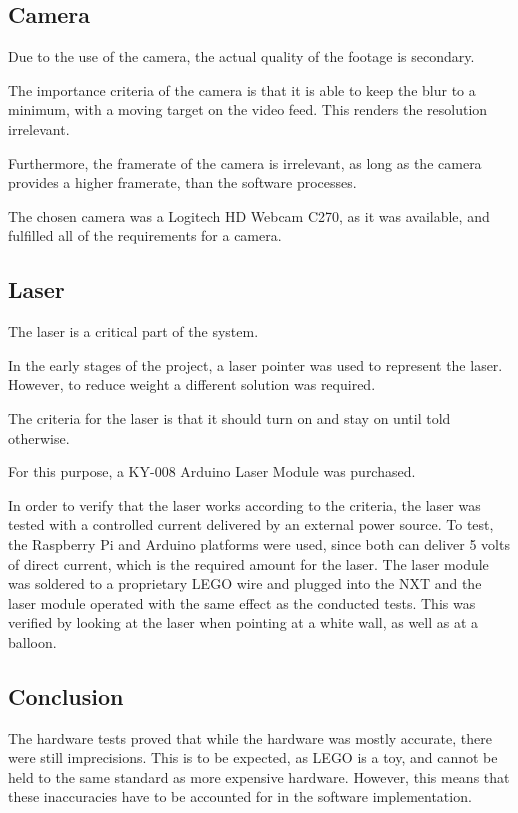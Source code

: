 \subsection*{Camera}
Due to the use of the camera, the actual quality of the footage is secondary.

The importance criteria of the camera is that it is able to keep the blur to a minimum, with a moving target on the video feed.
This renders the resolution irrelevant.

Furthermore, the framerate of the camera is irrelevant, as long as the camera provides a higher framerate, than the software processes.

The chosen camera was a Logitech HD Webcam C270, as it was available, and fulfilled all of the requirements for a camera\cite{logitechwebcam}.

\subsection*{Laser}
The laser is a critical part of the system.

In the early stages of the project, a laser pointer was used to represent the laser.
However, to reduce weight a different solution was required.

The criteria for the laser is that it should turn on and stay on until told otherwise. 

For this purpose, a KY-008 Arduino Laser Module was purchased\cite{LaserDatasheet}.

In order to verify that the laser works according to the criteria, the laser was tested with a controlled current delivered by an external power source.
To test, the Raspberry Pi and Arduino platforms were used, since both can deliver 5 volts of direct current, which is the required amount for the laser\cite{LaserDatasheet}.
The laser module was soldered to a proprietary LEGO wire and plugged into the NXT and the laser module operated with the same effect as the conducted tests. 
This was verified by looking at the laser when pointing at a white wall, as well as at a balloon.

\subsection*{Conclusion}
The hardware tests proved that while the hardware was mostly accurate, there were still imprecisions.
This is to be expected, as LEGO is a toy, and cannot be held to the same standard as more expensive hardware.
However, this means that these inaccuracies have to be accounted for in the software implementation.
